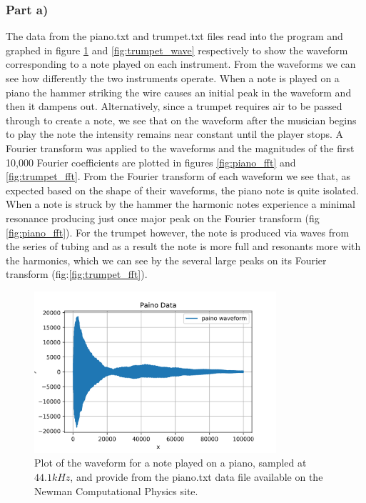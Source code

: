 \documentclass{article}
\begin{document}
\subsubsection{Part a)}
The data from the piano.txt and trumpet.txt files read into the program and graphed in figure \ref{fig:piano_wave} and \ref{fig:trumpet_wave} respectively to show the waveform corresponding to a note played on each instrument.
From the waveforms we can see how differently the two instruments operate. When a note is played on a piano the hammer striking the wire causes an initial peak in the waveform and then it dampens out. Alternatively, since a trumpet requires air to be passed through to create a note, we see that on the waveform after the musician begins to play the note the intensity remains near constant until the player stops. 
A Fourier transform was applied to the waveforms and the magnitudes of the first 10,000 Fourier coefficients are plotted in figures \ref{fig:piano_fft} and \ref{fig:trumpet_fft}. From the Fourier transform of each waveform we see that, as expected based on the shape of their waveforms, the piano note is quite isolated. When a note is struck by the hammer the harmonic notes experience a minimal resonance producing just once major peak on the Fourier transform (fig \ref{fig:piano_fft}). For the trumpet however, the note is produced via waves from the series of tubing and as a result the note is more full and resonants more with the harmonics, which we can see by the several large peaks on its Fourier transform (fig:\ref{fig:trumpet_fft}).  

\begin{figure}[H]
	\centering
	\includegraphics[width=0.8\textwidth]{../images/piano_wave.png}
	\caption{Plot of the waveform for a note played on a piano, sampled at $44.1kHz$, and provide from the piano.txt data file available on the Newman Computational Physics site.}
	\label{fig:piano_wave}
\end{figure}
\end{document}
